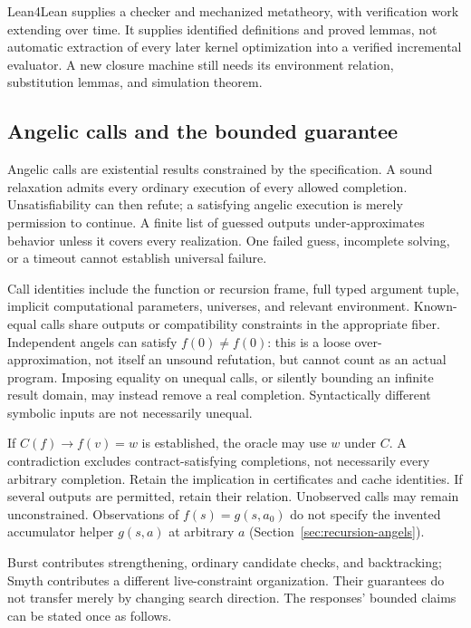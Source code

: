 Lean4Lean supplies a checker and mechanized metatheory, with verification work
extending over time. It supplies identified definitions and proved lemmas,
not automatic extraction of every later kernel optimization into a verified
incremental evaluator. A new closure machine still needs its environment
relation, substitution lemmas, and simulation theorem.
\cite{lean4lean,lean4lean2026}

\subsection{Angelic calls and the bounded guarantee}\label{sec:evaluation-angelic}

Angelic calls are existential results constrained by the specification. A sound
relaxation admits every ordinary execution of every allowed completion.
Unsatisfiability can then refute; a satisfying angelic execution is merely
permission to continue. A finite list of guessed outputs under-approximates
behavior unless it covers every realization. One failed guess, incomplete
solving, or a timeout cannot establish universal failure.

Call identities include the function or recursion frame, full typed argument
tuple, implicit computational parameters, universes, and relevant environment.
Known-equal calls share outputs or compatibility constraints in the appropriate
fiber. Independent angels can satisfy $f(0)\ne f(0)$: this is a loose
over-approximation, not itself an unsound refutation, but cannot count as an
actual program. Imposing equality on unequal calls, or silently bounding an
infinite result domain, may instead remove a real completion. Syntactically
different symbolic inputs are not necessarily unequal.

If $C(f)\to f(v)=w$ is established, the oracle may use $w$ under $C$.
A contradiction excludes contract-satisfying completions, not necessarily every
arbitrary completion. Retain the implication in certificates and cache
identities. If several outputs are permitted, retain their relation.
Unobserved calls may remain unconstrained. Observations of $f(s)=g(s,a_0)$
do not specify the invented accumulator helper $g(s,a)$ at arbitrary $a$
(Section~\ref{sec:recursion-angels}).

Burst contributes strengthening, ordinary candidate checks, and backtracking;
Smyth contributes a different live-constraint organization. Their guarantees
do not transfer merely by changing search direction\cite{burst,smyth}.
The responses' bounded claims can be stated once as follows.

